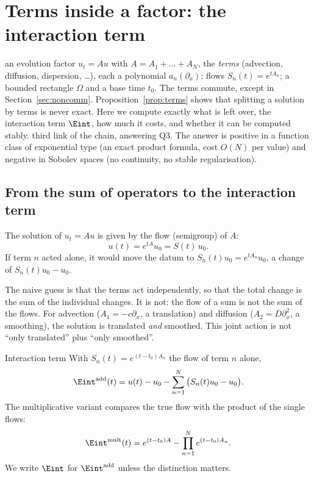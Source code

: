 \chapter{Terms inside a factor: the interaction term}\label{ch:interaction}
\chapterbrief
{an evolution factor $u_t=Au$ with $A=A_1+\dots+A_N$, the \emph{terms} (advection, diffusion, dispersion, \dots), each a polynomial $a_n(\partial_x)$; flows $S_n(t)=e^{tA_n}$; a bounded rectangle $\Omega$ and a base time $t_0$. The terms commute, except in Section~\ref{sec:noncomm}.}
{Proposition~\ref{prop:terms} shows that splitting a solution by terms is never exact. Here we compute exactly what is left over, the interaction term $\Eint$, how much it costs, and whether it can be computed stably.}
{third link of the chain, answering Q3. The answer is positive in a function class of exponential type (an exact product formula, cost $O(N)$ per value) and negative in Sobolev spaces (no continuity, no stable regularisation).}

\section{From the sum of operators to the interaction term}

The solution of $u_t=Au$ is given by the flow (semigroup) of $A$:
\[
u(t)=e^{tA}u_0=S(t)\,u_0 .
\]
If term $n$ acted alone, it would move the datum to $S_n(t)u_0=e^{tA_n}u_0$, a change of $S_n(t)u_0-u_0$.

The naive guess is that the terms act independently, so that the total change is the sum of the individual changes. It is not: the flow of a sum is not the sum of the flows. For advection ($A_1=-c\partial_x$, a translation) and diffusion ($A_2=D\partial_x^2$, a smoothing), the solution is translated \emph{and} smoothed. This joint action is not ``only translated'' plus ``only smoothed''.

\begin{definition}{Interaction term}\label{def:eint}
With $S_n(t)=e^{(t-t_0)A_n}$ the flow of term $n$ alone,
\begin{equation}\label{eq:eint-def}
\Eint^{\mathrm{add}}(t)=u(t)-u_0-\sum_{n=1}^N\big(S_n(t)u_0-u_0\big).
\end{equation}
The multiplicative variant compares the true flow with the product of the single flows:
\[
\Eint^{\mathrm{mult}}(t)=e^{(t-t_0)A}-\prod_{n=1}^Ne^{(t-t_0)A_n}.
\]
We write $\Eint$ for $\Eint^{\mathrm{add}}$ unless the distinction matters.
\end{definition}

